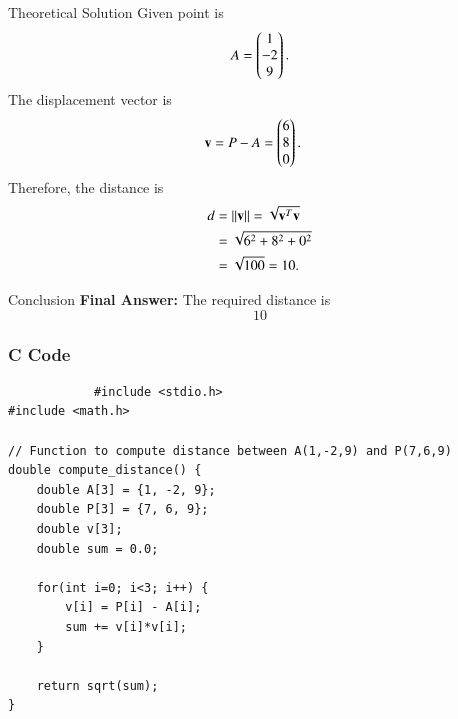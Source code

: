 \documentclass{beamer}
\begin{document}
\begin{frame}{Theoretical Solution}
Given point is
\begin{align}
    A = \begin{pmatrix}1 \\ -2 \\ 9\end{pmatrix}.
\end{align}
The displacement vector is
\begin{align}
    \mathbf{v} &= P - A = \begin{pmatrix}6 \\ 8 \\ 0\end{pmatrix}.
\end{align}
Therefore, the distance is
\begin{align}
    d &= \left\lVert\mathbf{v}\right\rVert = \sqrt{\mathbf{v}^T\mathbf{v}} \\
      &= \sqrt{6^2 + 8^2 + 0^2} \\
      &= \sqrt{100} = 10.
\end{align}
\end{frame}
\begin{frame}{Conclusion}
\textbf{Final Answer: } The required distance is 
\[
\boxed{10}
\]
	\end{frame}
	
	\begin{frame}[fragile]
		\frametitle{C Code }
		
		\begin{lstlisting}
			#include <stdio.h>
#include <math.h>

// Function to compute distance between A(1,-2,9) and P(7,6,9)
double compute_distance() {
    double A[3] = {1, -2, 9};
    double P[3] = {7, 6, 9};
    double v[3];
    double sum = 0.0;

    for(int i=0; i<3; i++) {
        v[i] = P[i] - A[i];
        sum += v[i]*v[i];
    }

    return sqrt(sum);
}
				
			\end{lstlisting}
		\end{frame}
		
\end{document}
